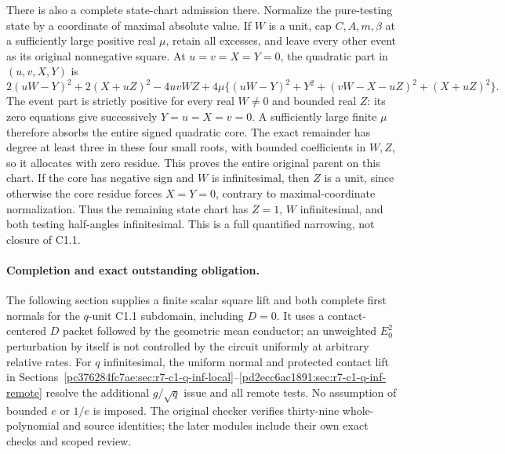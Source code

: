 There is also a complete state-chart admission there. Normalize the
pure-testing state by a coordinate of maximal absolute value. If
$W$ is a unit, cap $C,A,m,\beta$ at a sufficiently large positive
real $\mu$, retain all excesses, and leave every other event as its
original nonnegative square. At $u=v=X=Y=0$, the quadratic part in
$(u,v,X,Y)$ is
\[
 2(uW-Y)^2+2(X+uZ)^2-4uvWZ+
 4\mu\{(uW-Y)^2+Y^2+(vW-X-uZ)^2+(X+uZ)^2\}.
 \tag{SC8}
\]
The event part is strictly positive for every real $W\ne0$ and bounded
real $Z$: its zero equations give successively $Y=u=X=v=0$. A sufficiently
large finite $\mu$ therefore absorbs the entire signed quadratic core.
The exact remainder has degree at least three in these four small
roots, with bounded coefficients in $W,Z$, so it allocates with zero
residue. This proves the entire original parent on this chart.
If the core has negative sign and $W$ is infinitesimal, then $Z$ is
a unit, since otherwise the core residue forces $X=Y=0$, contrary
to maximal-coordinate normalization. Thus the remaining state chart
has $Z=1$, $W$ infinitesimal, and both testing half-angles infinitesimal.
This is a full quantified narrowing, not closure of C1.1.

\paragraph{Completion and exact outstanding obligation.}
The following section supplies a finite scalar square lift and both
complete first normals for the $q$-unit C1.1 subdomain, including
$D=0$. It uses a contact-centered $D$ packet followed by the geometric
mean conductor; an unweighted $E_0^2$ perturbation by itself is not
controlled by the circuit uniformly at arbitrary relative rates.
For $q$ infinitesimal, the uniform normal and protected contact lift
in Sections~\ref{pc376284fc7ae:sec:r7-c1-q-inf-local}--\ref{pd2ecc6ac1891:sec:r7-c1-q-inf-remote}
resolve the additional $g/\sqrt q$ issue and all remote tests.
No assumption of bounded $e$ or $1/e$ is imposed. The original
checker verifies thirty-nine whole-polynomial and source identities;
the later modules include their own exact checks and scoped review.
